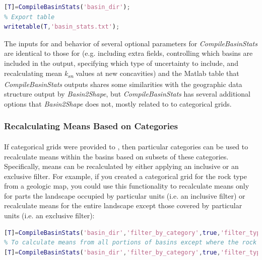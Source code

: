\begin{lstlisting}[language=Matlab]
% Generate basin stats table
[T]=CompileBasinStats('basin_dir');
% Export table
writetable(T,'basin_stats.txt');
\end{lstlisting}

\noindent
The inputs for and behavior of several optional parameters for \textit{CompileBasinStats} are identical to those for  (e.g. including extra fields, controlling which basins are included in the output, specifying which type of uncertainty to include, and recalculating mean \textit{k\textsubscript{sn}} values at new concavities) and the Matlab table that \textit{CompileBasinStats} outputs shares some similarities with the geographic data structure output by \textit{Basin2Shape}, but \textit{CompileBasinStats} has several additional options that \textit{Basin2Shape} does not, mostly related to to categorical grids.

\subsubsection{Recalculating Means Based on Categories}
\paragraph{}If categorical grids were provided to , then particular categories can be used to recalculate means within the basins based on subsets of these categories. Specifically, means can be recalculated by either applying an inclusive or an exclusive filter. For example, if you created a categorical grid for the rock type from a geologic map, you could use this functionality to recalculate means only for parts the landscape occupied by particular units (i.e. an inclusive filter) or recalculate means for the entire landscape except those covered by particular units (i.e. an exclusive filter):

\begin{lstlisting}[language=Matlab]
% To calculate means only from portions of a basin defined by certain rock types
[T]=CompileBasinStats('basin_dir','filter_by_category',true,'filter_type','include','cat_grid','geology','cat_values',{'pCc','grMz','pC','gr-m','Pc','grPz','grpC','gr'});
% To calculate means from all portions of basins except where the rock types are certain types
[T]=CompileBasinStats('basin_dir','filter_by_category',true,'filter_type','exclude','cat_grid','geology','cat_values',{'Q','Qpc','Qg','Qls','Qs','Qv','water','undef'});
\end{lstlisting}

